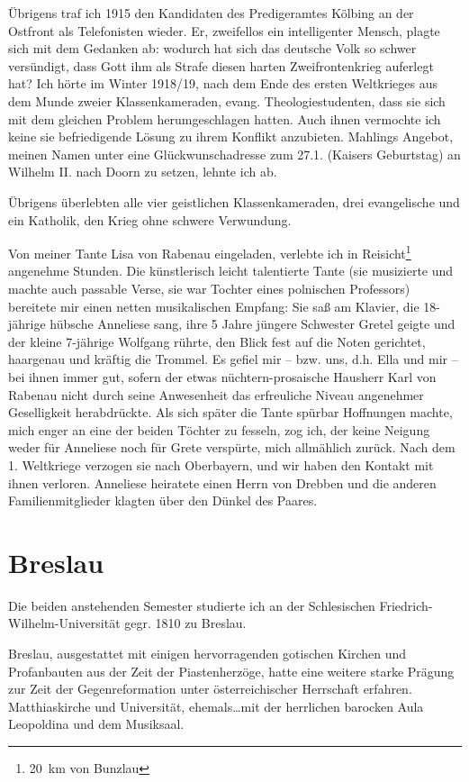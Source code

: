 Übrigens traf ich 1915 den Kandidaten des Predigeramtes Kölbing an der Ostfront als Telefonisten wieder. Er, zweifellos ein intelligenter Mensch, plagte sich mit dem Gedanken ab: wodurch hat sich das deutsche Volk so schwer versündigt, dass Gott ihm als Strafe diesen harten Zweifrontenkrieg auferlegt hat? Ich hörte im Winter 1918/19, nach dem Ende des ersten Weltkrieges aus dem Munde zweier Klassenkameraden, evang. Theologiestudenten, dass sie sich mit dem gleichen Problem herumgeschlagen hatten. Auch ihnen vermochte ich keine sie befriedigende Lösung zu ihrem Konflikt anzubieten. Mahlings Angebot, meinen Namen unter eine Glückwunschadresse zum 27.1. (Kaisers Geburtstag) an Wilhelm II. nach Doorn zu setzen, lehnte ich ab.

Übrigens überlebten alle vier geistlichen Klassenkameraden, drei evangelische und ein Katholik, den Krieg ohne schwere Verwundung.

Von meiner Tante Lisa von Rabenau eingeladen, verlebte ich in Reisicht\footnote{20~km von Bunzlau} angenehme Stunden. Die künstlerisch leicht talentierte Tante (sie musizierte und machte auch passable Verse, sie war Tochter eines polnischen Professors) bereitete mir einen netten musikalischen Empfang: Sie saß am Klavier, die 18-jährige hübsche Anneliese sang, ihre 5 Jahre jüngere Schwester Gretel geigte und der kleine 7-jährige Wolfgang rührte, den Blick fest auf die Noten gerichtet, haargenau und kräftig die Trommel. Es gefiel mir -- bzw. uns, d.h. Ella und mir -- bei ihnen immer gut, sofern der etwas nüchtern-prosaische Hausherr Karl von Rabenau nicht durch seine Anwesenheit das erfreuliche Niveau angenehmer Geselligkeit herabdrückte. Als sich später die Tante spürbar Hoffnungen machte, mich enger an eine der beiden Töchter zu fesseln, zog ich, der keine Neigung weder für Anneliese noch für Grete verspürte, mich allmählich zurück. Nach dem 1. Weltkriege verzogen sie nach Oberbayern, und wir haben den Kontakt mit ihnen verloren. Anneliese heiratete einen Herrn von Drebben und die anderen Familienmitglieder klagten über den Dünkel des Paares.


\section{Breslau}

Die beiden anstehenden Semester studierte ich an der Schlesischen Friedrich-Wilhelm-Universität gegr. 1810 zu Breslau.

Breslau, ausgestattet mit einigen hervorragenden gotischen Kirchen und Profanbauten aus der Zeit der Piastenherzöge, hatte eine weitere starke Prägung zur Zeit der Gegenreformation unter österreichischer Herrschaft erfahren. Matthiaskirche und Universität, ehemals\dots mit der herrlichen barocken Aula Leopoldina und dem Musiksaal.


